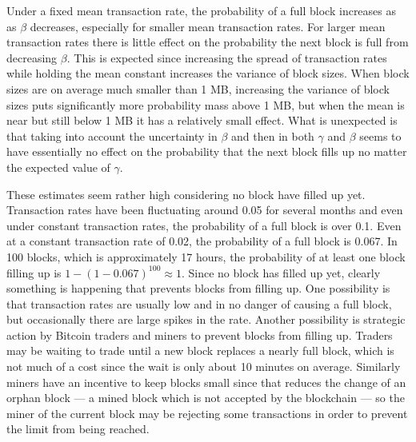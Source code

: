\documentclass{article}
\begin{document}
Under a fixed mean transaction rate, the probability of a full block increases as as $\beta$ decreases, especially for smaller mean transaction rates. For larger mean transaction rates there is little effect on the probability the next block is full from decreasing $\beta$. This is expected since increasing the spread of transaction rates while holding the mean constant increases the variance of block sizes. When block sizes are on average much smaller than 1 MB, increasing the variance of block sizes puts significantly more probability mass above 1 MB, but when the mean is near but still below 1 MB it has a relatively small effect. What is unexpected is that taking into account the uncertainty in $\beta$ and then in both $\gamma$ and $\beta$ seems to have essentially no effect on the probability that the next block fills up no matter the expected value of $\gamma$.

These estimates seem rather high considering no block have filled up yet. Transaction rates have been fluctuating around 0.05 for several months and even under constant transaction rates, the probability of a full block is over 0.1. Even at a constant transaction rate of 0.02, the probability of a full block is 0.067. In 100 blocks, which is approximately 17 hours, the probability of at least one block filling up is $1-(1-0.067)^{100}\approx 1$. Since no block has filled up yet, clearly something is happening that prevents blocks from filling up. One possibility is that transaction rates are usually low and in no danger of causing a full block, but occasionally there are large spikes in the rate. Another possibility is strategic action by Bitcoin traders and miners to prevent blocks from filling up. Traders may be waiting to trade until a new block replaces a nearly full block, which is not much of a cost since the wait is only about 10 minutes on average. Similarly miners have an incentive to keep blocks small since that reduces the change of an orphan block --- a mined block which is not accepted by the blockchain --- so the miner of the current block may be rejecting some transactions in order to prevent the limit from being reached.
\end{document}
